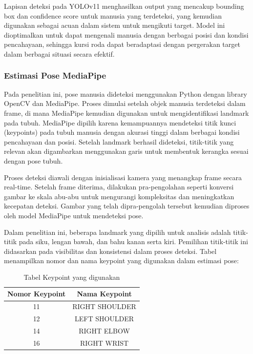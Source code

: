 Lapisan deteksi pada YOLOv11 menghasilkan output yang mencakup bounding box dan confidence score untuk manusia yang terdeteksi, yang kemudian digunakan sebagai acuan dalam sistem untuk mengikuti target. Model ini dioptimalkan untuk dapat mengenali manusia dengan berbagai posisi dan kondisi pencahayaan, sehingga kursi roda dapat beradaptasi dengan pergerakan target dalam berbagai situasi secara efektif.

\subsubsection{Estimasi Pose MediaPipe}
\label{subsubsec:estimasi_pose_mediapipe}

Pada penelitian ini, pose manusia dideteksi menggunakan Python dengan library OpenCV dan MediaPipe. Proses dimulai setelah objek manusia terdeteksi dalam frame, di mana MediaPipe kemudian digunakan untuk mengidentifikasi landmark pada tubuh. MediaPipe dipilih karena kemampuannya mendeteksi titik kunci (keypoints) pada tubuh manusia dengan akurasi tinggi dalam berbagai kondisi pencahayaan dan posisi. Setelah landmark berhasil dideteksi, titik-titik yang relevan akan digambarkan menggunakan garis untuk membentuk kerangka sesuai dengan pose tubuh.

Proses deteksi diawali dengan inisialisasi kamera yang menangkap frame secara real-time. Setelah frame diterima, dilakukan pra-pengolahan seperti konversi gambar ke skala abu-abu untuk mengurangi kompleksitas dan meningkatkan kecepatan deteksi. Gambar yang telah dipra-pengolah tersebut kemudian diproses oleh model MediaPipe untuk mendeteksi pose.

Dalam penelitian ini, beberapa landmark yang dipilih untuk analisis adalah titik-titik pada siku, lengan bawah, dan bahu kanan serta kiri. Pemilihan titik-titik ini didasarkan pada visibilitas dan konsistensi dalam proses deteksi. Tabel menampilkan nomor dan nama keypoint yang digunakan dalam estimasi pose:

\begin{table}[H]
  \centering
  \caption{Tabel Keypoint yang digunakan}
  \label{tab:keypoints}
  \begin{tabular}{|c|c|}
    \hline
    Nomor Keypoint & Nama Keypoint \\
    \hline
    11 & RIGHT SHOULDER \\
    12 & LEFT SHOULDER \\
    14 & RIGHT ELBOW \\
    16 & RIGHT WRIST \\
    \hline
  \end{tabular}
\end{table}


